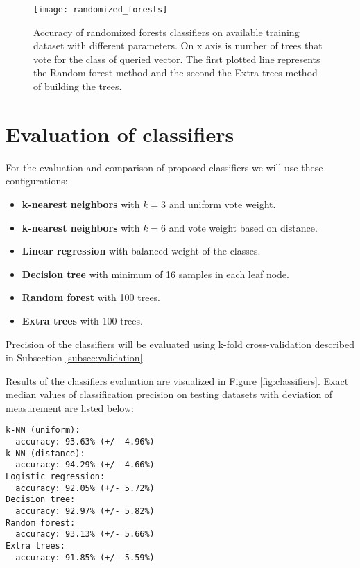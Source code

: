 \begin{figure}
  \centering
  \texttt{[image: randomized\_forests]}
  \caption{Accuracy of randomized forests classifiers on available training
    dataset with different parameters. On x axis is number of trees that vote
    for the class of queried vector. The first plotted line represents the
    Random forest method and the second the Extra trees method of building the
    trees.}
  \label{fig:randomized_forests}
\end{figure}

\section{Evaluation of classifiers} \label{sec:classifier_evaluation}
For the evaluation and comparison of proposed classifiers we will use these
configurations:
\begin{itemize}
\item \textbf{k-nearest neighbors} with $k=3$ and uniform vote weight.
\item \textbf{k-nearest neighbors} with $k=6$ and vote weight based on distance.
\item \textbf{Linear regression} with balanced weight of the classes.
\item \textbf{Decision tree} with minimum of 16 samples in each leaf node.
\item \textbf{Random forest} with 100 trees.
\item \textbf{Extra trees} with 100 trees.
\end{itemize}

Precision of the classifiers will be evaluated using k-fold cross-validation
described in Subsection \ref{subsec:validation}.

Results of the classifiers evaluation are visualized in Figure
\ref{fig:classifiers}. Exact median values of classification precision on
testing datasets with deviation of measurement are listed below:

\begin{minipage}{\linewidth}
\begin{verbatim}
k-NN (uniform):
  accuracy: 93.63% (+/- 4.96%)
k-NN (distance):
  accuracy: 94.29% (+/- 4.66%)
Logistic regression:
  accuracy: 92.05% (+/- 5.72%)
Decision tree:
  accuracy: 92.97% (+/- 5.82%)
Random forest:
  accuracy: 93.13% (+/- 5.66%)
Extra trees:
  accuracy: 91.85% (+/- 5.59%)
\end{verbatim}
\end{minipage}\\


